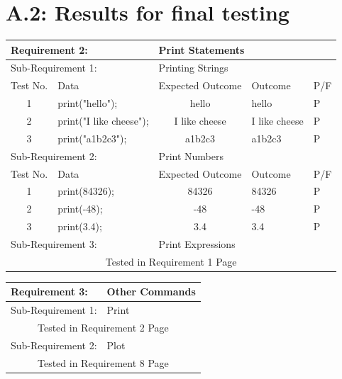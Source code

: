 \documentclass[a4paper, oneside, 11pt]{report}
\begin{document}
\section*{A.2: Results for final testing}
\label{results}
\newpage
\begin{table}
\label{tab:req2}
\begin{tabular}{clcll}
\hline
\multicolumn{2}{l}{Requirement 2:}             & \multicolumn{3}{l}{Print Statements} \\ \hline
\multicolumn{2}{l}{Sub-Requirement 1:}         & \multicolumn{3}{l}{Printing Strings}              \\
\multicolumn{1}{l}{Test No.} & Data            & \multicolumn{1}{l}{Expected Outcome}  & Outcome & P/F \\
1                            & print("hello");      & hello                            &  hello       & P    \\
2                            & print("I like cheese");  & I like cheese                 &  I like cheese       & P     \\
3                            & print("a1b2c3");  & a1b2c3                           &   a1b2c3      & P    \\
\multicolumn{2}{l}{Sub-Requirement 2:}         & \multicolumn{3}{l}{Print Numbers}           \\
\multicolumn{1}{l}{Test No.} & Data            & \multicolumn{1}{l}{Expected Outcome}  & Outcome & P/F \\
1                            & print(84326);     & 84326                            &  84326       & P     \\
2                            & print(-48);   & -48                                  &    -48     & P    \\
3                            & print(3.4); & 3.4                                  &     3.4    & P     \\
\multicolumn{2}{l}{Sub-Requirement 3:}         & \multicolumn{3}{l}{Print Expressions}        \\
\multicolumn{5}{c}{Tested in Requirement 1 Page \pageref{tab:req1}} 
\end{tabular}
\end{table}

\begin{table}
\label{tab:req3}
\begin{tabular}{clcll}
\hline
\multicolumn{2}{l}{Requirement 3:}             & \multicolumn{3}{l}{Other Commands} \\ \hline
\multicolumn{2}{l}{Sub-Requirement 1:}         & \multicolumn{3}{l}{Print}              \\
\multicolumn{5}{c}{Tested in Requirement 2 Page \pageref{tab:req2}} \\
\multicolumn{2}{l}{Sub-Requirement 2:}         & \multicolumn{3}{l}{Plot}           \\
\multicolumn{5}{c}{Tested in Requirement 8 Page \pageref{tab:req8}} \\
\end{tabular}
\end{table}
\end{document}
